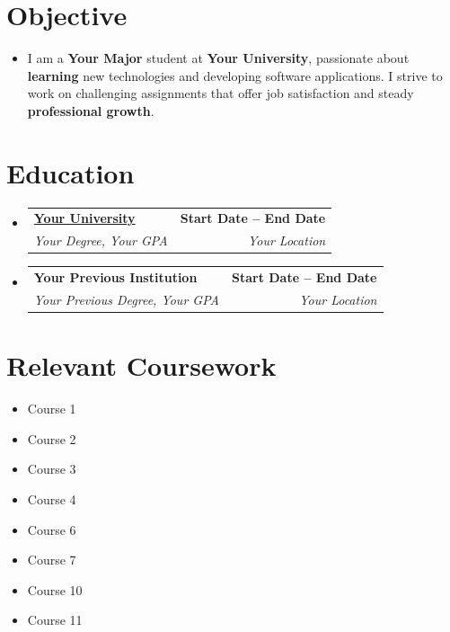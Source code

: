 \documentclass[a4paper,11pt]{article}
\makeatletter
\newcommand{\resumeSubheading}[4]{
  \vspace{-2pt}\item
    \begin{tabular*}{0.97\textwidth}[t]{l@{\extracolsep{\fill}}r}
      \textbf{#1} & \textbf{\small #2} \\
      \textit{\small#3} & \textit{\small #4} \\
    \end{tabular*}\vspace{-7pt}
}
\newcommand{\resumeSubHeadingListStart}{\begin{itemize}[leftmargin=0.15in, label={}]}
\newcommand{\resumeSubHeadingListEnd}{\end{itemize}}
\makeatother
\begin{document}
\section{Objective} 
  \begin{itemize}[leftmargin=0.15in, label={}]
    \item \fontsize{10}{12} {\selectfont
    I am a \textbf{Your Major} student at \textbf{Your University}, passionate about \textbf{learning} new technologies and developing software applications. I strive to work on challenging assignments that offer job satisfaction and steady \textbf{professional growth}.}
  \end{itemize}

\vspace{-15pt}
\section{Education}
  \resumeSubHeadingListStart
    \resumeSubheading
      {\href{https://youruniversity.com}{Your University}}{Start Date -- End Date}
      {Your Degree, Your GPA}{Your Location}
    \resumeSubheading
      {Your Previous Institution}{Start Date -- End Date}
      {Your Previous Degree, Your GPA}{Your Location}
  \resumeSubHeadingListEnd

\section{Relevant Coursework}
        \begin{multicols}{4}
            \begin{itemize}[itemsep=-3pt, parsep=3pt]
              \small
                \item Course 1
                \item Course 2
                \item Course 3
                \item Course 4
                \item Course 6
                \item Course 7
                \item Course 10
                \item Course 11
              \end{itemize}
        \end{multicols}
        \vspace*{2.0\multicolsep}
\end{document}
